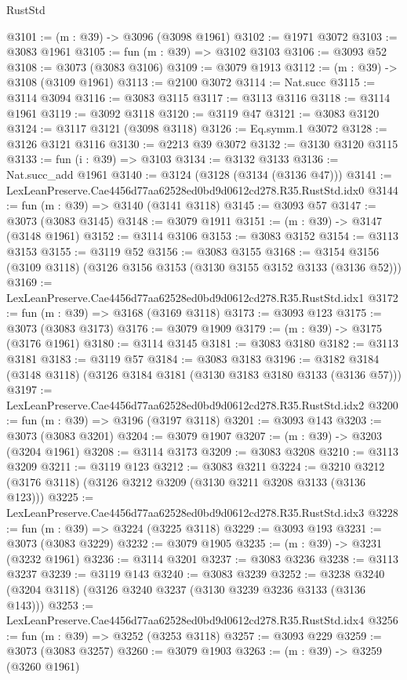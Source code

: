 \begin{lexlean}{RustStd}
\begin{coremodule}
@3101 := (m : @39) -> @3096 (@3098 @1961)
@3102 := @1971 @3072
@3103 := @3083 @1961
@3105 := fun (m : @39) => @3102 @3103
@3106 := @3093 @52
@3108 := @3073 (@3083 @3106)
@3109 := @3079 @1913
@3112 := (m : @39) -> @3108 (@3109 @1961)
@3113 := @2100 @3072
@3114 := Nat.succ
@3115 := @3114 @3094
@3116 := @3083 @3115
@3117 := @3113 @3116
@3118 := @3114 @1961
@3119 := @3092 @3118
@3120 := @3119 @47
@3121 := @3083 @3120
@3124 := @3117 @3121 (@3098 @3118)
@3126 := Eq.symm.{1} @3072
@3128 := @3126 @3121 @3116
@3130 := @2213 @39 @3072
@3132 := @3130 @3120 @3115
@3133 := fun (i : @39) => @3103
@3134 := @3132 @3133
@3136 := Nat.succ_add @1961
@3140 := @3124 (@3128 (@3134 (@3136 @47)))
@3141 := LexLeanPreserve.Cae4456d77aa62528ed0bd9d0612cd278.R35.RustStd.idx0
@3144 := fun (m : @39) => @3140 (@3141 @3118)
@3145 := @3093 @57
@3147 := @3073 (@3083 @3145)
@3148 := @3079 @1911
@3151 := (m : @39) -> @3147 (@3148 @1961)
@3152 := @3114 @3106
@3153 := @3083 @3152
@3154 := @3113 @3153
@3155 := @3119 @52
@3156 := @3083 @3155
@3168 := @3154 @3156 (@3109 @3118) (@3126 @3156 @3153 (@3130 @3155 @3152 @3133 (@3136 @52)))
@3169 := LexLeanPreserve.Cae4456d77aa62528ed0bd9d0612cd278.R35.RustStd.idx1
@3172 := fun (m : @39) => @3168 (@3169 @3118)
@3173 := @3093 @123
@3175 := @3073 (@3083 @3173)
@3176 := @3079 @1909
@3179 := (m : @39) -> @3175 (@3176 @1961)
@3180 := @3114 @3145
@3181 := @3083 @3180
@3182 := @3113 @3181
@3183 := @3119 @57
@3184 := @3083 @3183
@3196 := @3182 @3184 (@3148 @3118) (@3126 @3184 @3181 (@3130 @3183 @3180 @3133 (@3136 @57)))
@3197 := LexLeanPreserve.Cae4456d77aa62528ed0bd9d0612cd278.R35.RustStd.idx2
@3200 := fun (m : @39) => @3196 (@3197 @3118)
@3201 := @3093 @143
@3203 := @3073 (@3083 @3201)
@3204 := @3079 @1907
@3207 := (m : @39) -> @3203 (@3204 @1961)
@3208 := @3114 @3173
@3209 := @3083 @3208
@3210 := @3113 @3209
@3211 := @3119 @123
@3212 := @3083 @3211
@3224 := @3210 @3212 (@3176 @3118) (@3126 @3212 @3209 (@3130 @3211 @3208 @3133 (@3136 @123)))
@3225 := LexLeanPreserve.Cae4456d77aa62528ed0bd9d0612cd278.R35.RustStd.idx3
@3228 := fun (m : @39) => @3224 (@3225 @3118)
@3229 := @3093 @193
@3231 := @3073 (@3083 @3229)
@3232 := @3079 @1905
@3235 := (m : @39) -> @3231 (@3232 @1961)
@3236 := @3114 @3201
@3237 := @3083 @3236
@3238 := @3113 @3237
@3239 := @3119 @143
@3240 := @3083 @3239
@3252 := @3238 @3240 (@3204 @3118) (@3126 @3240 @3237 (@3130 @3239 @3236 @3133 (@3136 @143)))
@3253 := LexLeanPreserve.Cae4456d77aa62528ed0bd9d0612cd278.R35.RustStd.idx4
@3256 := fun (m : @39) => @3252 (@3253 @3118)
@3257 := @3093 @229
@3259 := @3073 (@3083 @3257)
@3260 := @3079 @1903
@3263 := (m : @39) -> @3259 (@3260 @1961)

\end{coremodule}
\end{lexlean}
